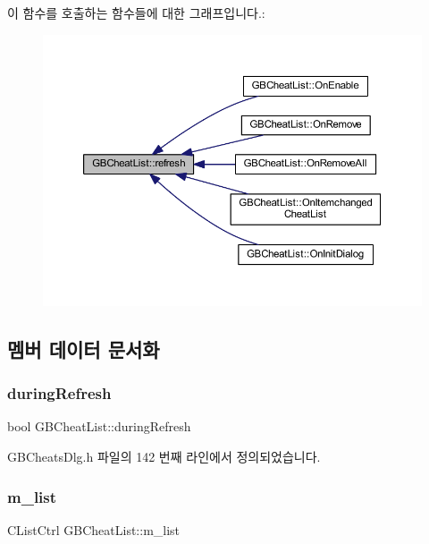 이 함수를 호출하는 함수들에 대한 그래프입니다.\+:
\nopagebreak
\begin{figure}[H]
\begin{center}
\leavevmode
\includegraphics[width=350pt]{class_g_b_cheat_list_a248cc28fa5e392d2f55d0f66ff6c5821_icgraph}
\end{center}
\end{figure}


\subsection{멤버 데이터 문서화}
\mbox{\label{class_g_b_cheat_list_aba5dc0a50355411fd9c82f87fbdbeb2e}} 
\subsubsection{\texorpdfstring{during\+Refresh}{duringRefresh}}
{\footnotesize\ttfamily bool G\+B\+Cheat\+List\+::during\+Refresh}



G\+B\+Cheats\+Dlg.\+h 파일의 142 번째 라인에서 정의되었습니다.

\mbox{\label{class_g_b_cheat_list_aca0eaf2ff30100f5d11e4c80193ad90e}} 
\subsubsection{\texorpdfstring{m\+\_\+list}{m\_list}}
{\footnotesize\ttfamily C\+List\+Ctrl G\+B\+Cheat\+List\+::m\+\_\+list}



